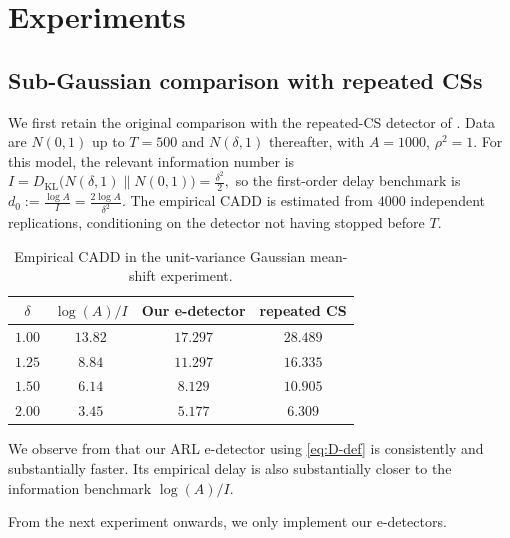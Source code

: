 \documentclass[12pt]{article}
\theoremstyle{spaced}
\theoremstyle{remark}
\begin{document}
\section{Experiments}
\label{sec:experiments-updated}


\subsection{Sub-Gaussian comparison with repeated CSs}
We first retain the original comparison with the repeated-CS detector of
\citet{shekhar2023reducing}.  Data are $N(0,1)$ up to $T=500$ and
$N(\delta,1)$ thereafter, with $A=1000$, $\rho^2=1$. For this model, the relevant information number is
$ I=D_{\mathrm{KL}}\bigl(N(\delta,1)\|N(0,1)\bigr)
    =
    \frac{\delta^2}{2},$
so the first-order delay benchmark is
$d_0:=\frac{\log A}{I}
    =
    \frac{2\log A}{\delta^2}.$
The empirical CADD is estimated from \(4000\) independent replications,
conditioning on the detector not having stopped before \(T\).

\begin{table}[H]
\centering
\small
\caption{Empirical CADD in the unit-variance Gaussian mean-shift experiment.}
\label{tab:subg-repeated-cs}
\begin{tabular}{cccc}
\toprule
$\delta$ & $\log(A)/I$ & Our e-detector & repeated CS \\
\midrule
$1.00$ & $13.82$ & $17.297$  &  $28.489$ \\
$1.25$ & $8.84$  & $11.297$ & $16.335$ \\
$1.50$ & $6.14$  & $8.129$  & $10.905$ \\
$2.00$ & $3.45$  & $5.177$ & $6.309$ \\
\bottomrule
\end{tabular}
\end{table}

We observe from  that our ARL e-detector using \eqref{eq:D-def} is consistently and substantially faster. Its empirical delay is also substantially closer to
the information benchmark \(\log(A)/I\).

From the next experiment onwards, we only implement our e-detectors.
\end{document}
